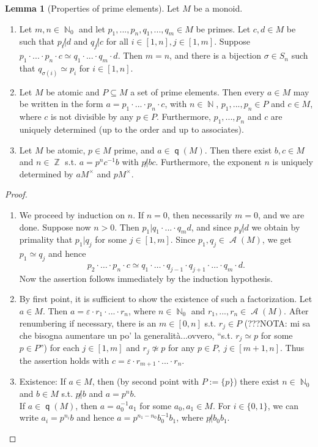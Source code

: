 \documentclass[12pt,a4paper]{report}
\theoremstyle{definition}
\newtheorem{lemma}[theorem]{Lemma}
\theoremstyle{num.custom-title}
\DeclareMathOperator{\A}{\mathcal{A}}
\DeclareMathOperator{\N}{\mathbb{N}}
\DeclareMathOperator{\Z}{\mathbb{Z}}
\DeclareMathOperator{\sse}{\subseteq}
\DeclareMathOperator{\q}{\mathsf{q}}
\renewcommand{\epsilon}{\varepsilon}
\begin{document}
\begin{lemma}[Properties of prime elements]\label{prime_el_prop}
Let $M$ be a monoid.
\begin{enumerate}
\item Let $m,n \in \N_0$ and let $p_1,...,p_n,q_1,...,q_m \in M$ be primes. Let $c,d \in M$ be such that $p_i \not| d$ and $q_j \not| c$ for all $i \in [1,n], j \in [1,m]$. Suppose $p_1 \cdot ... \cdot p_n \cdot c \simeq q_1 \cdot ... \cdot q_m \cdot d$. Then $m=n$, and there is a bijection $\sigma \in S_n$ such that $q_{\sigma(i)} \simeq p_i$ for $i \in [1,n]$.
\item Let $M$ be atomic and $P \sse M$ a set of prime elements. Then every $a \in M$ may be written in the form $a=p_1 \cdot ... \cdot p_n \cdot c$, with $n \in \N$, $p_1,...,p_n \in P$ and $c \in M$, where $c$ is not divisible by any $p \in P$. Furthermore, $p_1,...,p_n$ and $c$ are uniquely determined (up to the order and up to associates).
\item Let $M$ be atomic, $p \in M$ prime, and $a \in \q(M)$. Then there exist $b,c \in M$ and $n \in \Z$ s.t. $a=p^n c^{-1} b$ with $p \not| bc$. Furthermore, the exponent $n$ is uniquely determined by $aM^\times$ and $pM^\times$.
\end{enumerate}
\begin{proof}\ 
\begin{enumerate}
\item We proceed by induction on $n$. If $n=0$, then necessarily $m=0$, and we are done. Suppose now $n>0$. Then $p_1 | q_1 \cdot ... \cdot q_m d$, and since $p_1 \not| d$ we obtain by primality that $p_1 | q_j$ for some $j \in [1,m]$. Since $p_1,q_j \in \A(M)$, we get $p_1 \simeq q_j$ and hence
\[
p_2 \cdot \ldots \cdot p_n \cdot c \simeq q_1 \cdot \ldots \cdot q_{j-1} \cdot q_{j+1} \cdot \ldots \cdot q_m \cdot d.
\]
Now the assertion follows immediately by the induction hypothesis.
\item By first point, it is sufficient to show the existence of such a factorization. Let $a \in M$. Then $a= \epsilon \cdot r_1 \cdot ... \cdot r_n$, where $n \in \N_0$ and $r_1,...,r_n \in \A(M)$. After renumbering if necessary, there is an $m \in [0,n]$ s.t. $r_j \in P$ (???NOTA: mi sa che bisogna aumentare un po' la generalità...ovvero, ``s.t. $r_j \simeq p$ for some $p \in P$'') for each $j \in [1,m]$ and $r_j \not\simeq p$ for any $p \in P, \ j \in [m+1,n]$. Thus the assertion holds with $c = \epsilon \cdot r_{m+1} \cdot ... \cdot r_n$.
\item Existence: If $a \in M$, then (by second point with $P:=\{p\}$) there exist $n \in \N_0$ and $b \in M$ s.t. $p \not| b$ and $a=p^nb$.\\
If $a \in \q(M)$, then $a=a_0^{-1} a_1$ for some $a_0,a_1 \in M$. For $i \in \{0,1\}$, we can write $a_i=p^{n_i} b$ and hence $a=p^{n_1-n_0} b_0^{-1} b_1$, where $p \not| b_0b_1$.


\end{enumerate}
\end{proof}
\end{lemma}
\end{document}
